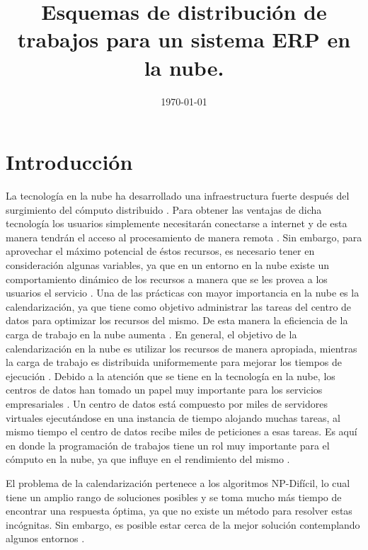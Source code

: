 \documentclass[jou,apacite]{apa6}
\title{Esquemas de distribución de trabajos para un sistema ERP en la nube.}
\date{\small{\today}}
\begin{document}
\maketitle    
                        
\section{Introducción}

La tecnolog\'ia en la nube ha desarrollado una infraestructura fuerte despu\'es del surgimiento del c\'omputo distribuido \cite{chen2009cloud}. Para obtener las ventajas de dicha tecnolog\'ia los usuarios simplemente necesitar\'an conectarse a internet y de esta manera tendr\'an el acceso al procesamiento de manera remota \cite{aranganathan2011aco}. Sin embargo, para aprovechar el m\'aximo potencial de \'estos recursos, es necesario tener en consideraci\'on algunas variables, ya que en un entorno en la nube existe un comportamiento din\'amico de los recursos a manera que se les provea a los usuarios el servicio \cite{shimpy2014different}.
Una de las pr\'acticas con mayor importancia en la nube es la calendarizaci\'on, ya que tiene como objetivo administrar las tareas del centro de datos para optimizar los recursos del mismo. De esta manera la eficiencia de la carga de trabajo en la nube aumenta \cite{shimpy2014different}.
En general, el objetivo de la calendarizaci\'on en la nube es utilizar los recursos de manera apropiada, mientras la carga de trabajo es distribuida uniformemente para mejorar los tiempos de ejecuci\'on \cite{shimpy2014different}.
Debido a la atenci\'on que se tiene en la tecnolog\'ia en la nube, los centros de datos han tomado un papel muy importante para los servicios empresariales \cite{shimpy2014different}. 
Un centro de datos est\'a compuesto por miles de servidores virtuales ejecut\'andose en una instancia de tiempo alojando muchas tareas, al mismo tiempo el centro de datos recibe miles de peticiones a esas tareas. Es aqu\'i en donde la programaci\'on de trabajos tiene un rol muy importante para el c\'omputo en la nube, ya que influye en el rendimiento del mismo \cite{srinivasan2014cloud}. 

El problema de la calendarizaci\'on pertenece a los algoritmos NP-Dif\'icil, lo cual tiene un amplio rango de soluciones posibles y se toma mucho m\'as tiempo de encontrar una respuesta \'optima, ya que no existe un m\'etodo para resolver estas inc\'ognitas. Sin embargo, es posible estar cerca de la mejor soluci\'on contemplando algunos entornos \cite{shimpy2014different}.
\end{document}
